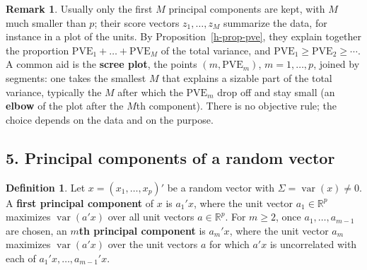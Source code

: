 \documentclass[12pt]{article}
\newcommand{\R}{\mathbb R}
\DeclareMathOperator\var{var}
\theoremstyle{definition}
\newtheorem{definition}[theorem]{Definition}
\newtheorem{remark}[theorem]{Remark}
\begin{document}
\begin{remark}\label{h-rem-number}
Usually only the first \(M\) principal components are kept, with \(M\) much smaller than \(p\); their score vectors
\(z_1,\dots,z_M\) summarize the data, for instance in a plot of the units. By Proposition~\ref{h-prop-pve}, they explain
together the proportion \(\mathrm{PVE}_1+\dots+\mathrm{PVE}_M\) of the total variance, and
\(\mathrm{PVE}_1\geqslant\mathrm{PVE}_2\geqslant\cdots\). A common aid is the \textbf{scree plot}, the points
\((m,\mathrm{PVE}_m)\), \(m=1,\dots,p\), joined by segments: one takes the smallest \(M\) that explains a sizable part of
the total variance, typically the \(M\) after which the \(\mathrm{PVE}_m\) drop off and stay small (an \textbf{elbow} of
the plot after the \(M\)th component). There is no objective rule; the choice depends on the data and on the purpose.
\end{remark}

\subsection*{5. Principal components of a random vector}

\begin{definition}\label{h-def-pop-pc}
Let \(x=(x_1,\dots,x_p)'\) be a random vector with \(\Sigma=\var(x)\ne0\). A \textbf{first principal
component} of \(x\) is \(a_1'x\), where the unit vector \(a_1\in\R^p\) maximizes \(\var(a'x)\) over all unit
vectors \(a\in\R^p\). For \(m\geqslant2\), once \(a_1,\dots,a_{m-1}\) are chosen, an \textbf{\(m\)th principal
component} is \(a_m'x\), where the unit vector \(a_m\) maximizes \(\var(a'x)\) over the unit vectors
\(a\) for which \(a'x\) is uncorrelated with each of \(a_1'x,\dots,a_{m-1}'x\).
\end{definition}
\end{document}
